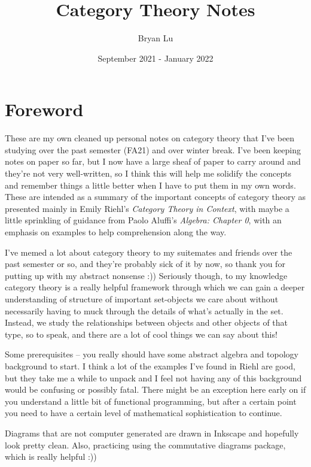 \documentclass[12pt]{scrartcl}
\title{Category Theory Notes}
\author{Bryan Lu}
\date{September 2021 - January 2022} %
\begin{document}
\maketitle

\setcounter{section}{-1}
\section{Foreword}
These are my own cleaned up personal notes on category theory that I've been studying over the past semester (FA21) and over winter break. I've been keeping notes on paper so far, but I now have a large sheaf of paper to carry around and they're not very well-written, so I think this will help me solidify the concepts and remember things a little better when I have to put them in my own words. These are intended as a summary of the important concepts of category theory as presented mainly in Emily Riehl's \textit{Category Theory in Context}, with maybe a little sprinkling of guidance from Paolo Aluffi's \textit{Algebra: Chapter 0}, with an emphasis on examples to help comprehension along the way.

I've memed a lot about category theory to my suitemates and friends over the past semester or so, and they're probably sick of it by now, so thank you for putting up with my abstract nonsense :)) Seriously though, to my knowledge category theory is a really helpful framework through which we can gain a deeper understanding of structure of important set-objects we care about without necessarily having to muck through the details of what's actually in the set. Instead, we study the relationships between objects and other objects of that type, so to speak, and there are a lot of cool things we can say about this!

Some prerequisites -- you really should have some abstract algebra and topology background to start. I think a lot of the examples I've found in Riehl are good, but they take me a while to unpack and I feel not having any of this background would be confusing or possibly fatal. There might be an exception here early on if you understand a little bit of functional programming, but after a certain point you need to have a certain level of mathematical sophistication to continue.

Diagrams that are not computer generated are drawn in Inkscape and hopefully look pretty clean. Also, practicing using the commutative diagrams package, which is really helpful :))

\pagebreak



\pagebreak


\end{document}
